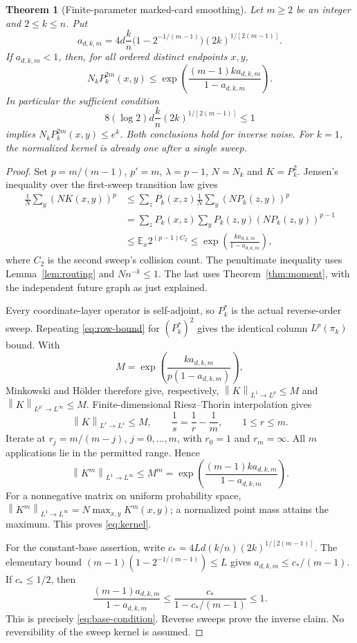\documentclass[11pt]{article}
\numberwithin{equation}{section}
\newtheorem{theorem}{Theorem}[section]
\theoremstyle{definition}\newtheorem{definition}[theorem]{Definition}
\theoremstyle{remark}\newtheorem{remark}[theorem]{Remark}
\newcommand{\E}{\mathbb E}
\newcommand{\norm}[1]{\left\lVert#1\right\rVert}
\begin{document}
\begin{theorem}[Finite-parameter marked-card smoothing]\label{thm:smoothing}
Let $m\ge2$ be an integer and $2\le k\le n$. Put
\begin{equation}\label{eq:am}
 a_{d,k,m}=4d\frac{k}{n}
 \bigl(1-2^{-1/(m-1)}\bigr)(2k)^{1/[2(m-1)]}.
\end{equation}
If $a_{d,k,m}<1$, then, for all ordered distinct endpoints $x,y$,
\begin{equation}\label{eq:kernel}
 N_kP_k^{2m}(x,y)\le
 \exp\!\left(\frac{(m-1)k a_{d,k,m}}{1-a_{d,k,m}}\right).
\end{equation}
In particular the sufficient condition
\begin{equation}\label{eq:base-condition}
 8(\log2)d\frac{k}{n}(2k)^{1/[2(m-1)]}\le1
\end{equation}
implies $N_kP_k^{2m}(x,y)\le e^k$. Both conclusions hold for inverse noise.
For $k=1$, the normalized kernel is already one after a single sweep.
\end{theorem}
\begin{proof}
Set $p=m/(m-1)$, $p'=m$, $\lambda=p-1$, $N=N_k$ and $K=P_k^2$.
Jensen's inequality over the first-sweep transition law gives
\begin{align}
 \frac1N\sum_y(NK(x,y))^p
 &\le\sum_zP_k(x,z)\frac1N\sum_y(NP_k(z,y))^p\nonumber\\
 &=\sum_zP_k(x,z)\sum_yP_k(z,y)(NP_k(z,y))^{p-1}\nonumber\\
 &\le\E_x2^{(p-1)C_2}
 \le\exp\!\left(\frac{k a_{d,k,m}}{1-a_{d,k,m}}\right),
 \label{eq:row-bound}
\end{align}
where $C_2$ is the second sweep's collision count. The penultimate inequality
uses Lemma~\ref{lem:routing} and $Nn^{-k}\le1$. The last uses
Theorem~\ref{thm:moment}, with the independent future graph as just explained.

Every coordinate-layer operator is self-adjoint, so $P_k^*$ is the actual
reverse-order sweep. Repeating \eqref{eq:row-bound} for $(P_k^*)^2$ gives the
identical column $L^p(\pi_k)$ bound. With
\[
 M=\exp\!\left(\frac{k a_{d,k,m}}{p(1-a_{d,k,m})}\right),
\]
Minkowski and H\"older therefore give, respectively,
$\norm K_{L^1\to L^p}\le M$ and
$\norm K_{L^{p'}\to L^\infty}\le M$.
Finite-dimensional Riesz--Thorin interpolation gives
\[
 \norm K_{L^r\to L^s}\le M,
 \qquad \frac1s=\frac1r-\frac1m,
 \qquad 1\le r\le m.
\]
Iterate at $r_j=m/(m-j)$, $j=0,\ldots,m$, with $r_0=1$ and
$r_m=\infty$. All $m$ applications lie in the permitted range. Hence
\[
 \norm{K^m}_{L^1\to L^\infty}\le M^m
 =\exp\!\left(\frac{(m-1)k a_{d,k,m}}{1-a_{d,k,m}}\right).
\]
For a nonnegative matrix on uniform probability space,
$\norm{K^m}_{L^1\to L^\infty}=N\max_{x,y}K^m(x,y)$; a normalized point mass
attains the maximum. This proves \eqref{eq:kernel}.

For the constant-base assertion, write
$c_*=4Ld(k/n)(2k)^{1/[2(m-1)]}$. The elementary bound
$(m-1)(1-2^{-1/(m-1)})\le L$ gives
$a_{d,k,m}\le c_* /(m-1)$. If $c_*\le1/2$, then
\[
 \frac{(m-1)a_{d,k,m}}{1-a_{d,k,m}}
 \le\frac{c_*}{1-c_* /(m-1)}\le1.
\]
This is precisely \eqref{eq:base-condition}. Reverse sweeps prove the
inverse claim. No reversibility of the sweep kernel is assumed.
\end{proof}
\end{document}
